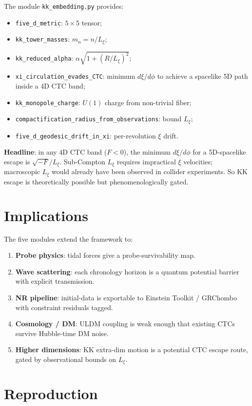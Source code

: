 \documentclass[11pt,a4paper]{article}
\begin{document}
The module \texttt{kk\_embedding.py} provides:
\begin{itemize}
\item \texttt{five\_d\_metric}: $5\times 5$ tensor;
\item \texttt{kk\_tower\_masses}: $m_n = n/L_\xi$;
\item \texttt{kk\_reduced\_alpha}: $\alpha\sqrt{1 + (R/L_\xi)^2}$;
\item \texttt{xi\_circulation\_evades\_CTC}: minimum $d\xi/d\phi$ to
  achieve a spacelike 5D path inside a 4D CTC band;
\item \texttt{kk\_monopole\_charge}: $U(1)$ charge from non-trivial fiber;
\item \texttt{compactification\_radius\_from\_observations}: bound $L_\xi$;
\item \texttt{five\_d\_geodesic\_drift\_in\_xi}: per-revolution $\xi$ drift.
\end{itemize}

\textbf{Headline}: in any 4D CTC band ($F < 0$), the minimum
$d\xi/d\phi$ for a 5D-spacelike escape is
$\sqrt{-F}/L_\xi$. Sub-Compton $L_\xi$ requires impractical $\xi$
velocities; macroscopic $L_\xi$ would already have been observed
in collider experiments. So KK escape is theoretically possible but
phenomenologically gated.

\section{Implications}

The five modules extend the framework to:
\begin{enumerate}
\item \textbf{Probe physics}: tidal forces give a probe-survivability map.
\item \textbf{Wave scattering}: each chronology horizon is a quantum
  potential barrier with explicit transmission.
\item \textbf{NR pipeline}: initial-data is exportable to Einstein
  Toolkit / GRChombo with constraint residuals tagged.
\item \textbf{Cosmology / DM}: ULDM coupling is weak enough that
  existing CTCs survive Hubble-time DM noise.
\item \textbf{Higher dimensions}: KK extra-dim motion is a
  potential CTC escape route, gated by observational bounds on
  $L_\xi$.
\end{enumerate}

\section{Reproduction}
\end{document}
